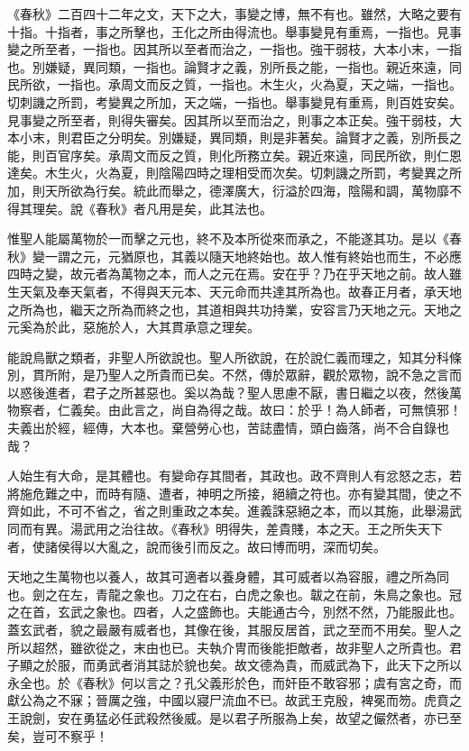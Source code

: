 
《春秋》二百四十二年之文，天下之大，事變之博，無不有也。雖然，大略之要有十指。十指者，事之所擊也，王化之所由得流也。舉事變見有重焉，一指也。見事變之所至者，一指也。因其所以至者而治之，一指也。強干弱枝，大本小末，一指也。別嫌疑，異同類，一指也。論賢才之義，別所長之能，一指也。親近來遠，同民所欲，一指也。承周文而反之質，一指也。木生火，火為夏，天之端，一指也。切刺譏之所罰，考變異之所加，天之端，一指也。舉事變見有重焉，則百姓安矣。見事變之所至者，則得失審矣。因其所以至而治之，則事之本正矣。強干弱枝，大本小末，則君臣之分明矣。別嫌疑，異同類，則是非著矣。論賢才之義，別所長之能，則百官序矣。承周文而反之質，則化所務立矣。親近來遠，同民所欲，則仁恩達矣。木生火，火為夏，則陰陽四時之理相受而次矣。切刺譏之所罰，考變異之所加，則天所欲為行矣。統此而舉之，德澤廣大，衍溢於四海，陰陽和調，萬物靡不得其理矣。說《春秋》者凡用是矣，此其法也。


惟聖人能屬萬物於一而擊之元也，終不及本所從來而承之，不能遂其功。是以《春秋》變一謂之元，元猶原也，其義以隨天地終始也。故人惟有終始也而生，不必應四時之變，故元者為萬物之本，而人之元在焉。安在乎？乃在乎天地之前。故人雖生天氣及奉天氣者，不得與天元本、天元命而共達其所為也。故春正月者，承天地之所為也，繼天之所為而終之也，其道相與共功持業，安容言乃天地之元。天地之元奚為於此，惡施於人，大其貫承意之理矣。

能說鳥獸之類者，非聖人所欲說也。聖人所欲說，在於說仁義而理之，知其分科條別，貫所附，是乃聖人之所貴而已矣。不然，傳於眾辭，觀於眾物，說不急之言而以惑後進者，君子之所甚惡也。奚以為哉？聖人思慮不厭，書日繼之以夜，然後萬物察者，仁義矣。由此言之，尚自為得之哉。故曰：於乎！為人師者，可無慎邪！夫義出於經，經傳，大本也。棄營勞心也，苦誌盡情，頭白齒落，尚不合自錄也哉？

人始生有大命，是其體也。有變命存其間者，其政也。政不齊則人有忿怒之志，若將施危難之中，而時有隨、遭者，神明之所接，絕續之符也。亦有變其間，使之不齊如此，不可不省之，省之則重政之本矣。進義誅惡絕之本，而以其施，此舉湯武同而有異。湯武用之治往故。《春秋》明得失，差貴賤，本之天。王之所失天下者，使諸侯得以大亂之，說而後引而反之。故曰博而明，深而切矣。


天地之生萬物也以養人，故其可適者以養身體，其可威者以為容服，禮之所為同也。劍之在左，青龍之象也。刀之在右，白虎之象也。韍之在前，朱鳥之象也。冠之在首，玄武之象也。四者，人之盛飾也。夫能通古今，別然不然，乃能服此也。蓋玄武者，貌之最嚴有威者也，其像在後，其服反居首，武之至而不用矣。聖人之所以超然，雖欲從之，末由也已。夫執介冑而後能拒敵者，故非聖人之所貴也。君子顯之於服，而勇武者消其誌於貌也矣。故文德為貴，而威武為下，此天下之所以永全也。於《春秋》何以言之？孔父義形於色，而奸臣不敢容邪；虞有宮之奇，而獻公為之不寐；晉厲之強，中國以寢尸流血不已。故武王克殷，裨冕而笏。虎賁之王說劍，安在勇猛必任武殺然後威。是以君子所服為上矣，故望之儼然者，亦已至矣，豈可不察乎！

